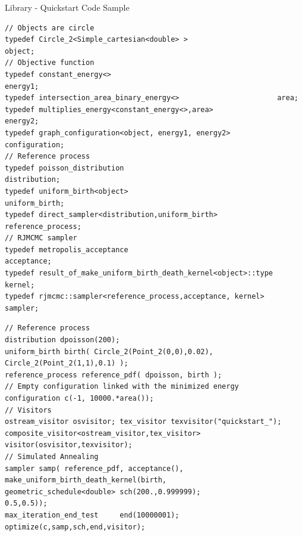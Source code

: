 \documentclass{beamer}
\begin{document}
\begin{frame}[containsverbatim]{Library - Quickstart Code Sample}
\tiny
\begin{lstlisting}
// Objects are circle
typedef Circle_2<Simple_cartesian<double> >                     object;
// Objective function
typedef constant_energy<>                                       energy1;
typedef intersection_area_binary_energy<>                       area;
typedef multiplies_energy<constant_energy<>,area>               energy2;
typedef graph_configuration<object, energy1, energy2>           configuration;
// Reference process
typedef poisson_distribution                                    distribution;
typedef uniform_birth<object>                                   uniform_birth;
typedef direct_sampler<distribution,uniform_birth>              reference_process;
// RJMCMC sampler
typedef metropolis_acceptance                                   acceptance;
typedef result_of_make_uniform_birth_death_kernel<object>::type kernel;
typedef rjmcmc::sampler<reference_process,acceptance, kernel>   sampler;
\end{lstlisting}
\begin{lstlisting}
// Reference process
distribution dpoisson(200);
uniform_birth birth( Circle_2(Point_2(0,0),0.02), Circle_2(Point_2(1,1),0.1) );
reference_process reference_pdf( dpoisson, birth );
// Empty configuration linked with the minimized energy
configuration c(-1, 10000.*area());
// Visitors
ostream_visitor osvisitor; tex_visitor texvisitor("quickstart_");
composite_visitor<ostream_visitor,tex_visitor>  visitor(osvisitor,texvisitor);
// Simulated Annealing
sampler samp( reference_pdf, acceptance(), make_uniform_birth_death_kernel(birth,
geometric_schedule<double> sch(200.,0.999999);                         0.5,0.5));
max_iteration_end_test     end(10000001);
optimize(c,samp,sch,end,visitor);
\end{lstlisting}

\end{frame}
\end{document}
